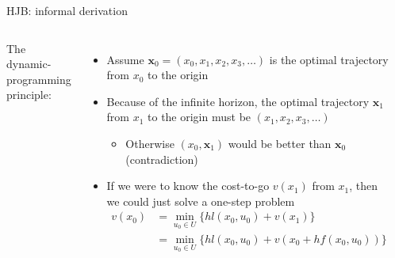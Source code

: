 \documentclass[aspectratio=169]{beamer}
\begin{document}
\begin{frame}{HJB: informal derivation}
\begin{columns}
The dynamic-programming principle:
\begin{itemize}
\item
Assume $\mathbf x_0 = (x_0, x_1, x_2, x_3, \ldots)$ is the optimal trajectory from $x_0$ to the origin
\item
Because of the infinite horizon, the optimal trajectory $\mathbf x_1$ from $x_1$ to the origin must be
$(x_1, x_2, x_3, \ldots)$
\begin{itemize}
\item
Otherwise $(x_0, \mathbf x_1)$ would be better than $\mathbf x_0$ (contradiction)
\end{itemize}
\item
If we were to know the cost-to-go $v(x_1)$ from $x_1$, then we could just solve a one-step problem
\begin{align*}
v(x_0) & = \min_{u_0 \in U} \{ h l(x_0, u_0) + v(x_1) \} \\
& = \min_{u_0 \in U} \{ h l(x_0, u_0) + v(x_0 + h f(x_0, u_0)) \} \\
\end{align*}
\end{itemize}
\vspace{-5mm}
\begin{figure}
\includegraphics[width=\columnwidth]{figures/dp_principle.pdf}
\end{figure}
\end{columns}
\end{frame}
\end{document}
